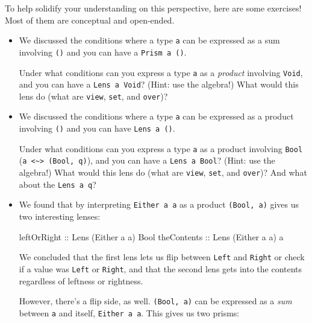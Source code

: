 \documentclass[]{article}
\newenvironment{Shaded}{}{}
\newcommand{\DataTypeTok}[1]{\textcolor[rgb]{0.56,0.13,0.00}{#1}}
\newcommand{\NormalTok}[1]{#1}
\newcommand{\OtherTok}[1]{\textcolor[rgb]{0.00,0.44,0.13}{#1}}
\begin{document}
To help solidify your understanding on this perspective, here are some
exercises! Most of them are conceptual and open-ended.

\begin{itemize}
\item
  We discussed the conditions where a type \texttt{a} can be expressed as a sum
  involving \texttt{()} and you can have a
  \texttt{Prism\textquotesingle{}\ a\ ()}.

  Under what conditions can you express a type \texttt{a} as a \emph{product}
  involving \texttt{Void}, and you can have a
  \texttt{Lens\textquotesingle{}\ a\ Void}? (Hint: use the algebra!) What would
  this lens do (what are \texttt{view}, \texttt{set}, and \texttt{over})?
\item
  We discussed the conditions where a type \texttt{a} can be expressed as a
  product involving \texttt{()} and you can have
  \texttt{Lens\textquotesingle{}\ a\ ()}.

  Under what conditions can you express a type \texttt{a} as a product involving
  \texttt{Bool}
  (\texttt{a\ \textless{}\textasciitilde{}\textgreater{}\ (Bool,\ q)}), and you
  can have a \texttt{Lens\textquotesingle{}\ a\ Bool}? (Hint: use the algebra!)
  What would this lens do (what are \texttt{view}, \texttt{set}, and
  \texttt{over})? And what about the \texttt{Lens\textquotesingle{}\ a\ q}?
\item
  We found that by interpreting \texttt{Either\ a\ a} as a product
  \texttt{(Bool,\ a)} gives us two interesting lenses:

\begin{Shaded}
\begin{Highlighting}[]
\OtherTok{leftOrRight ::} \DataTypeTok{Lens\textquotesingle{}}\NormalTok{ (}\DataTypeTok{Either}\NormalTok{ a a) }\DataTypeTok{Bool}
\OtherTok{theContents ::} \DataTypeTok{Lens\textquotesingle{}}\NormalTok{ (}\DataTypeTok{Either}\NormalTok{ a a) a}
\end{Highlighting}
\end{Shaded}

  We concluded that the first lens lets us flip between \texttt{Left} and
  \texttt{Right} or check if a value was \texttt{Left} or \texttt{Right}, and
  that the second lens gets into the contents regardless of leftness or
  rightness.

  However, there's a flip side, as well. \texttt{(Bool,\ a)} can be expressed as
  a \emph{sum} between \texttt{a} and itself, \texttt{Either\ a\ a}. This gives
  us two prisms:


\end{itemize}
\end{document}
